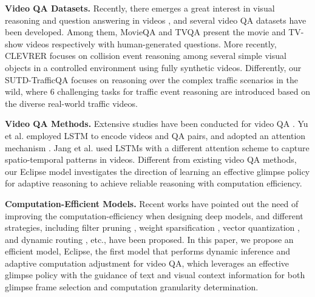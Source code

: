 \documentclass[final]{cvpr}
\begin{document}
\textbf{Video QA Datasets.}
Recently, there emerges a great interest in visual reasoning and question answering in videos \cite{10.1007/s11263-016-0987-1,maharaj2017dataset,zhu2017uncovering,ijcai2017-280}, and several video QA datasets \cite{xu2017video,zeng2016leveraging,tapaswi2016movieqa,zadeh2019social,jang2017tgif,garcia2020knowit,emrvqasongMM18,yu2019activityqa} have been developed. Among them, 
MovieQA \cite{tapaswi2016movieqa} and TVQA \cite{lei2018tvqa} present the movie and TV-show videos respectively with human-generated questions. More recently, 
CLEVRER \cite{yi2019clevrer} focuses on collision event reasoning among several simple visual objects
in a controlled environment using fully synthetic videos. Differently, our SUTD-TrafficQA focuses on reasoning over the complex traffic scenarios in the wild, where 6 challenging tasks for traffic event reasoning are introduced based on the diverse real-world
traffic
videos.  

\textbf{Video QA Methods.}
Extensive studies have been conducted for video QA \cite{yu2017end,jang2017tgif,garcia2020knowledge,Jiang_2020_CVPR,Kim_2020_CVPR,lei-etal-2020-tvqa,tsai2019GSTEG,li2019beyond,Kim_2018_ECCV,Yu_2018_ECCV,sukhbaatar2015end,wang2018movie,fan2019heterogeneous,liang2018focal,tensoremnlp17,8654010}. 
Yu et al. \cite{yu2017end} employed LSTM to encode videos and QA pairs, and adopted an attention mechanism \cite{you2016image}. 
Jang et al. \cite{jang2017tgif} used LSTMs with a different attention scheme to capture spatio-temporal patterns in videos. 
Different from existing video QA methods, our Eclipse model investigates the direction of learning an effective glimpse policy for adaptive reasoning to achieve reliable reasoning with computation efficiency.

\textbf{Computation-Efficient Models.}
Recent works \cite{Bhardwaj_2019_CVPR,Mu_2019_CVPR,strubell2019energy,figurnov2017spatially, korbar2019scsampler,wu2019adaframe,schwartz2019green,NEURIPS2019_bd853b47, fan2020adaptive} have pointed out the need of improving the computation-efficiency when designing deep models, and 
different strategies, including filter pruning \cite{li2016pruning}, weight sparsification \cite{sun2016sparsifying}, vector quantization \cite{agustsson2017soft}, and dynamic routing \cite{wang2018skipnet}, etc., have been proposed. In this paper, we propose an efficient model, Eclipse, the first model that performs dynamic inference and adaptive computation adjustment for video QA, which leverages an effective glimpse policy with the guidance of text and visual context information for both glimpse frame selection and computation granularity determination.
\end{document}

